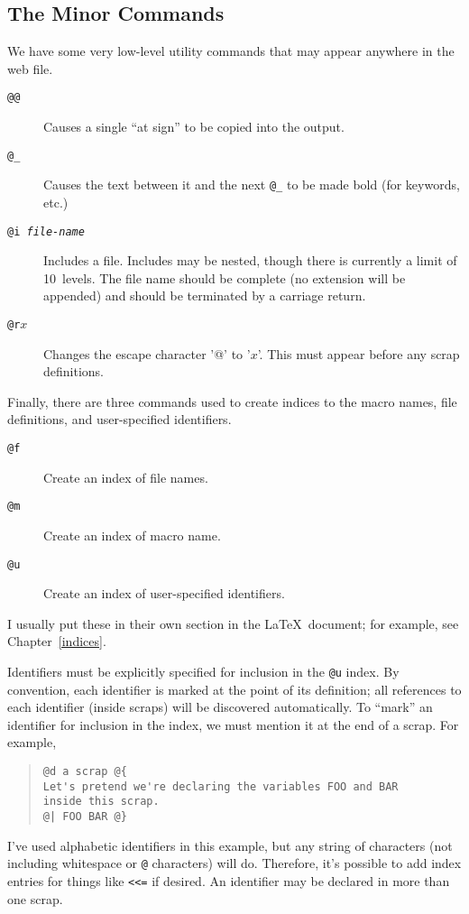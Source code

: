 \documentclass{report}
\begin{document}
\subsection{The Minor Commands\label{minorcommands}}

We have some very low-level utility commands that may appear anywhere
in the web file.
\begin{description}
\item[\tt @@] Causes a single ``at sign'' to be copied into the output.
\item[\tt @\_] Causes the text between it and the next {\tt @\_}
      to be made bold (for keywords, etc.)
\item[\tt @i {\em file-name\/}] Includes a file. Includes may be
  nested, though there is currently a limit of 10~levels. The file name
  should be complete (no extension will be appended) and should be
  terminated by a carriage return.
\item[{\tt @r}$x$] Changes the escape character '@' to '$x$'.  
  This must appear before any scrap definitions.
\end{description}
Finally, there are three commands used to create indices to the macro
names, file definitions, and user-specified identifiers.
\begin{description}
\item[\tt @f] Create an index of file names.
\item[\tt @m] Create an index of macro name.
\item[\tt @u] Create an index of user-specified identifiers.
\end{description}
I usually put these in their own section
in the \LaTeX\ document; for example, see Chapter~\ref{indices}.

Identifiers must be explicitly specified for inclusion in the
\verb|@u| index. By convention, each identifier is marked at the
point of its definition; all references to each identifier (inside
scraps) will be discovered automatically. To ``mark'' an identifier
for inclusion in the index, we must mention it at the end of a scrap.
For example,
\begin{quote}
\begin{verbatim}
@d a scrap @{
Let's pretend we're declaring the variables FOO and BAR
inside this scrap.
@| FOO BAR @}
\end{verbatim}
\end{quote}
I've used alphabetic identifiers in this example, but any string of
characters (not including whitespace or \verb|@| characters) will do.
Therefore, it's possible to add index entries for things like
\verb|<<=| if desired. An identifier may be declared in more than one
scrap.
\end{document}
